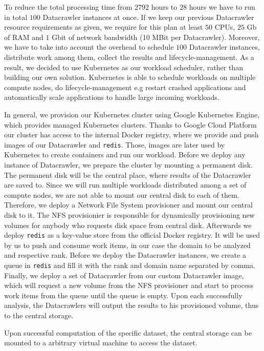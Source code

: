To reduce the total processing time from $2792$ hours to $28$ hours we have to run in total $100$ Datacrawler instances at once. If we keep our previous Datacrawler resource requirements as given, we require for this plan at least $50$ CPUs, $25$ Gb of RAM and $1$ Gbit of network bandwidth (10 MBit per Datacrawler). Moreover, we have to take into account the overhead to schedule $100$ Datacrawler instances, distribute work among them, collect the results and lifecycle-management. As a result, we decided to use Kubernetes as our workload scheduler, rather than building our own solution. Kubernetes is able to schedule workloads on multiple compute nodes, do lifecycle-management e.g restart crashed applications and automatically scale applications to handle large incoming workloads.

In general, we provision our Kubernetes cluster using Google Kubernetes Engine, which provides managed Kubernetes clusters. Thanks to Google Cloud Platform our cluster has access to the internal Docker registry, where we provide and push images of our Datacrawler and \texttt{redis}. Those, images are later used by Kubernetes to create containers and run our workload. Before we deploy any instance of Datacrawler, we prepare the cluster by mounting a permanent disk. The permanent disk will be the central place, where results of the Datacrawler are saved to. Since we will run multiple workloads distributed among a set of compute nodes, we are not able to mount our central disk to each of them. Therefore, we deploy a Network File System provisioner and mount our central disk to it. The NFS provisionier is responsible for dynamically provisioning new volumes for anybody who requests disk space from central disk. Afterwards we deploy \texttt{redis} as a key-value store from the official Docker registry. It will be used by us to push and consume work items, in our case the domain to be analyzed and respective rank. Before we deploy the Datacrawler instances, we create a queue in \texttt{redis} and fill it with the rank and domain name separated by comma. Finally, we deploy a set of Datacrawler from our custom Datacrawler image, which will request a new volume from the NFS provisioner and start to process work items from the queue until the queue is empty. Upon each successfully analysis, the Datacrawlers will output the results to his provisioned volume, thus to the central storage.

Upon successful computation of the specific dataset, the central storage can be mounted to a arbitrary virtual machine to access the dataset. 

